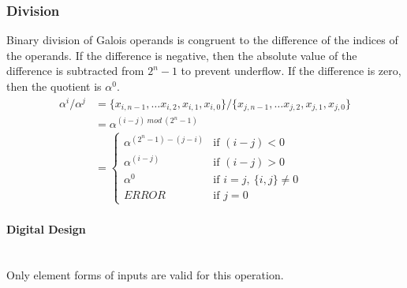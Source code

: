 \subsubsection{Division} Binary division of Galois operands is congruent to the
difference of the indices of the operands. If the difference is negative, then
the absolute value of the difference is subtracted from $2^{n}-1$ to prevent
underflow. If the difference is zero, then the quotient is $\alpha^{0}$.
    \begin{align*}
        \alpha^{i} / \alpha^{j} & = \{x_{i, n-1},\ldots x_{i, 2},x_{i,
        1},x_{i, 0}\} / \{x_{j, n-1}, \ldots x_{j, 2}, x_{j, 1}, x_{j, 0}\}
        \\
        & = \alpha^{(i - j) \ mod \ (2^{n}-1)} \\
        & = \begin{cases}
            \alpha^{(2^{n}-1) - (j - i)} & \text{if $(i - j) < 0$} \\
            \alpha^{(i - j)} & \text{if $(i - j) > 0$} \\
            \alpha^{0} & \text{if $i = j, \ \{i,j\} \neq 0$} \\
            ERROR & \text{if $j = 0$}
        \end{cases}
    \end{align*}

    \paragraph{{\small Digital Design}} \leavevmode \\ Only element forms of
    inputs are valid for this operation.

